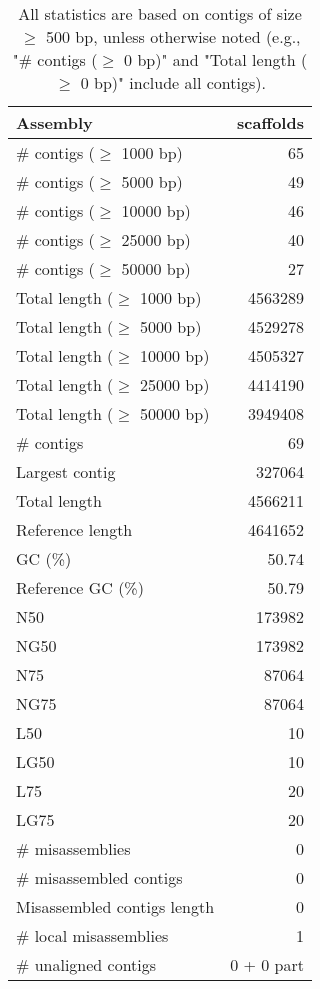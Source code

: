 \documentclass[12pt,a4paper]{article}
\begin{document}
\begin{table}[ht]
\begin{center}
\caption{All statistics are based on contigs of size $\geq$ 500 bp, unless otherwise noted (e.g., "\# contigs ($\geq$ 0 bp)" and "Total length ($\geq$ 0 bp)" include all contigs).}
\begin{tabular}{|l*{1}{|r}|}
\hline
Assembly & scaffolds \\ \hline
\# contigs ($\geq$ 1000 bp) & 65 \\ \hline
\# contigs ($\geq$ 5000 bp) & 49 \\ \hline
\# contigs ($\geq$ 10000 bp) & 46 \\ \hline
\# contigs ($\geq$ 25000 bp) & 40 \\ \hline
\# contigs ($\geq$ 50000 bp) & 27 \\ \hline
Total length ($\geq$ 1000 bp) & 4563289 \\ \hline
Total length ($\geq$ 5000 bp) & 4529278 \\ \hline
Total length ($\geq$ 10000 bp) & 4505327 \\ \hline
Total length ($\geq$ 25000 bp) & 4414190 \\ \hline
Total length ($\geq$ 50000 bp) & 3949408 \\ \hline
\# contigs & 69 \\ \hline
Largest contig & 327064 \\ \hline
Total length & 4566211 \\ \hline
Reference length & 4641652 \\ \hline
GC (\%) & 50.74 \\ \hline
Reference GC (\%) & 50.79 \\ \hline
N50 & 173982 \\ \hline
NG50 & 173982 \\ \hline
N75 & 87064 \\ \hline
NG75 & 87064 \\ \hline
L50 & 10 \\ \hline
LG50 & 10 \\ \hline
L75 & 20 \\ \hline
LG75 & 20 \\ \hline
\# misassemblies & 0 \\ \hline
\# misassembled contigs & 0 \\ \hline
Misassembled contigs length & 0 \\ \hline
\# local misassemblies & 1 \\ \hline
\# unaligned contigs & 0 + 0 part \\ \hline

\end{tabular}
\end{center}
\end{table}
\end{document}
